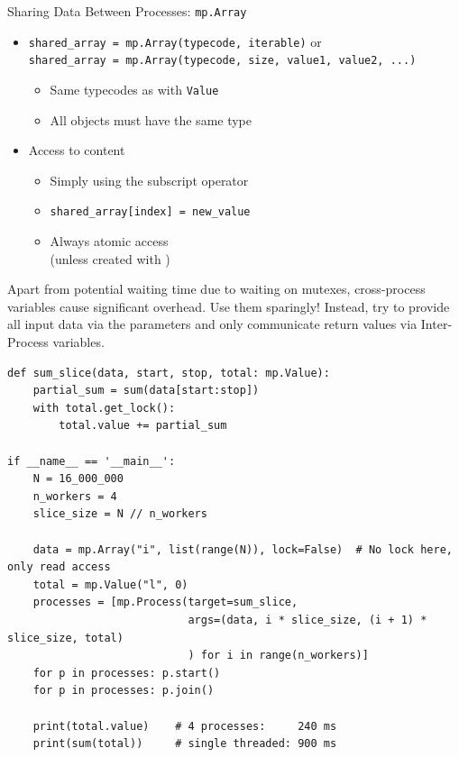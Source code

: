\begin{frame}{Sharing Data Between Processes: \texttt{mp.Array}}
%
\begin{itemize}
\item \texttt{shared\_array = mp.Array(typecode, iterable)} or \\
	\texttt{shared\_array = mp.Array(typecode, size, value1, value2, ...)}
	\begin{itemize}
	\item Same typecodes as with \texttt{Value}
	\item All objects must have the same type
	\end{itemize}
\item Access to content
	\begin{itemize}
	\item Simply using the subscript operator
	\item \texttt{shared\_array[index] = new\_value}
	\item Always atomic access \\
		(unless created with )
	\end{itemize}
\end{itemize}
%
\begin{warnbox}
\small
Apart from potential waiting time due to waiting on mutexes, cross-process variables cause significant overhead. Use them sparingly! Instead, try to provide all input data via the parameters and only communicate return values via Inter-Process variables.
\end{warnbox}
%
\end{frame}


\begin{frame}[fragile]
%
\begin{codebox}
\begin{verbatim}
def sum_slice(data, start, stop, total: mp.Value):
    partial_sum = sum(data[start:stop])
    with total.get_lock():
        total.value += partial_sum

if __name__ == '__main__':
    N = 16_000_000
    n_workers = 4
    slice_size = N // n_workers
    
    data = mp.Array("i", list(range(N)), lock=False)  # No lock here, only read access
    total = mp.Value("l", 0)
    processes = [mp.Process(target=sum_slice,
                            args=(data, i * slice_size, (i + 1) * slice_size, total)
                            ) for i in range(n_workers)]
    for p in processes: p.start()
    for p in processes: p.join()
    
    print(total.value)    # 4 processes:     240 ms
    print(sum(total))     # single threaded: 900 ms
\end{verbatim}
\end{codebox}
%
\end{frame}


